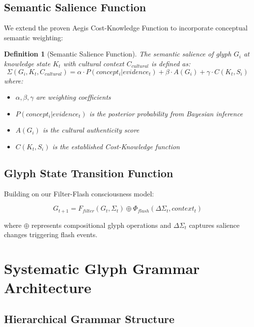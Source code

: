 \documentclass[12pt]{article}
\newtheorem{definition}{Definition}
\begin{document}
\subsection{Semantic Salience Function}

We extend the proven Aegis Cost-Knowledge Function to incorporate conceptual semantic weighting:

\begin{definition}[Semantic Salience Function]
The semantic salience of glyph $G_i$ at knowledge state $K_t$ with cultural context $C_{cultural}$ is defined as:
\begin{equation}
\Sigma(G_i, K_t, C_{cultural}) = \alpha \cdot P(concept_i | evidence_t) + \beta \cdot A(G_i) + \gamma \cdot C(K_t, S_i)
\end{equation}
where:
\begin{itemize}
    \item $\alpha, \beta, \gamma$ are weighting coefficients
    \item $P(concept_i | evidence_t)$ is the posterior probability from Bayesian inference
    \item $A(G_i)$ is the cultural authenticity score
    \item $C(K_t, S_i)$ is the established Cost-Knowledge function
\end{itemize}
\end{definition}

\subsection{Glyph State Transition Function}

Building on our Filter-Flash consciousness model:

\begin{equation}
G_{t+1} = F_{filter}(G_t, \Sigma_t) \oplus \Phi_{flash}(\Delta\Sigma_t, context_t)
\end{equation}

where $\oplus$ represents compositional glyph operations and $\Delta\Sigma_t$ captures salience changes triggering flash events.

\section{Systematic Glyph Grammar Architecture}

\subsection{Hierarchical Grammar Structure}
\end{document}

